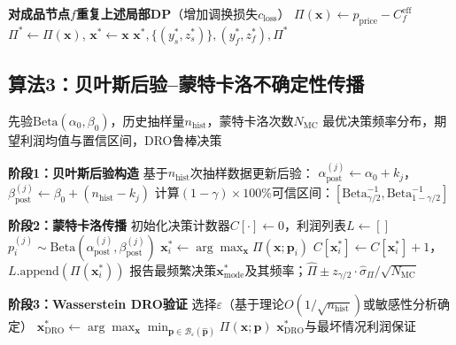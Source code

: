 \documentclass[12pt,a4paper]{ctexart}
\begin{document}
\begin{algorithm}[H]
\begin{algorithmic}[1]
    \State \textbf{对成品节点$f$重复上述局部DP}（增加调换损失$c_{\text{loss}}$）
    \State $\Pi(\mathbf{x}) \leftarrow p_{\text{price}} - C_f^{\text{eff}}$
        \State $\Pi^* \leftarrow \Pi(\mathbf{x})$, $\mathbf{x}^* \leftarrow \mathbf{x}$
    \EndIf
\EndFor
\State \Return $\mathbf{x}^*, \{(y_s^*, z_s^*)\}, (y_f^*, z_f^*), \Pi^*$
\end{algorithmic}
\end{algorithm}

\subsection{算法3：贝叶斯后验--蒙特卡洛不确定性传播}

\begin{algorithm}[H]
\caption{不确定性传播框架（问题4）}
\begin{algorithmic}[1]
\Require 先验$\text{Beta}(\alpha_0, \beta_0)$，历史抽样量$n_{\text{hist}}$，蒙特卡洛次数$N_{\text{MC}}$
\Ensure 最优决策频率分布，期望利润均值与置信区间，DRO鲁棒决策

\State \textbf{阶段1：贝叶斯后验构造}
    \State 基于$n_{\text{hist}}$次抽样数据更新后验：
    \State $\alpha_{\text{post}}^{(j)} \leftarrow \alpha_0 + k_j$，$\beta_{\text{post}}^{(j)} \leftarrow \beta_0 + (n_{\text{hist}} - k_j)$
    \State 计算$(1-\gamma)\times 100\%$可信区间：$[\text{Beta}_{\gamma/2}^{-1}, \text{Beta}_{1-\gamma/2}^{-1}]$
\EndFor

\State \textbf{阶段2：蒙特卡洛传播}
\State 初始化决策计数器$C[\cdot] \leftarrow 0$，利润列表$L \leftarrow []$
        \State $p_i^{(j)} \sim \text{Beta}(\alpha_{\text{post}}^{(j)}, \beta_{\text{post}}^{(j)})$ 
    \EndFor
    \State $\mathbf{x}^*_i \leftarrow \arg\max_{\mathbf{x}} \Pi(\mathbf{x}; \mathbf{p}_i)$ 
    \State $C[\mathbf{x}^*_i] \leftarrow C[\mathbf{x}^*_i] + 1$，$L.\text{append}(\Pi(\mathbf{x}^*_i))$
\EndFor
\State 报告最频繁决策$\mathbf{x}^*_{\text{mode}}$及其频率；$\hat{\Pi} \pm z_{\gamma/2} \cdot \hat{\sigma}_{\Pi}/\sqrt{N_{\text{MC}}}$

\State \textbf{阶段3：Wasserstein DRO验证}
\State 选择$\varepsilon$（基于理论$O(1/\sqrt{n_{\text{hist}}})$或敏感性分析确定）
\State $\mathbf{x}^*_{\text{DRO}} \leftarrow \arg\max_{\mathbf{x}} \min_{\mathbf{p} \in \mathcal{B}_\varepsilon(\hat{\mathbf{p}})} \Pi(\mathbf{x}; \mathbf{p})$
\State \Return $\mathbf{x}^*_{\text{DRO}}$与最坏情况利润保证
\end{algorithmic}
\end{algorithm}
\end{document}
